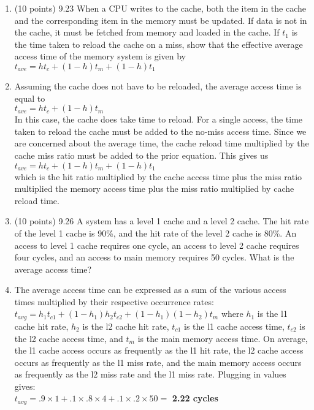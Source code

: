 \documentclass[letterpaper,10pt,onecolumn,titlepage]{article}
\begin{document}
\begin{enumerate}

\item (10 points) 9.23
	When a CPU writes to the cache, both the item in the cache and the corresponding
	item in the memory must be updated. If data is not in the cache, it must be
	fetched from memory and loaded in the cache. If $t_{1}$ is the time taken to
	reload the cache on a miss, show that the effective average access time of the
	memory system is given by \\
	$t_{ave} = ht_{c} + (1-h)t_{m} + (1-h)t_{1}$

\item[\textbullet] Assuming the cache does not have to be reloaded, the average
	access time is equal to \\
	$t_{ave} = ht_{c} + (1-h)t_{m}$ \\
	In this case, the cache does take time to reload. For a single access, the time
	taken to reload the cache must be added to the no-miss access time. Since we are
	concerned about the average time, the cache reload time multiplied by the cache
	miss ratio must be added to the prior equation. This gives us \\
	$t_{ave} = ht_{c} + (1-h)t_{m} + (1-h)t_{1}$ \\
	which is the hit ratio multiplied by the cache access time plus the miss ratio
	multiplied the memory access time plus the miss ratio multiplied by cache reload
	time.

\item (10 points) 9.26
	A system has a level 1 cache and a level 2 cache. The hit rate of the
	level 1 cache is 90\%, and the hit rate of the level 2 cache is 80\%. An access to
	level 1 cache requires one cycle, an access to level 2 cache requires four cycles,
	and an access to main memory requires 50 cycles. What is the average access time?
\item[\textbullet] The average access time can be expressed as a sum of the various access
	times multiplied by their respective occurrence rates: \\
	$t_{avg}=h_{1}t_{c1}+(1-h_{1})h_{2}t_{c2}+(1-h_{1})(1-h_{2})t_{m}$
	where $h_{1}$ is the l1 cache hit rate, $h_{2}$ is the l2 cache hit rate, $t_{c1}$
	is the l1 cache access time, $t_{c2}$ is the l2 cache access time, and $t_{m}$ is
	the main memory access time. On average, the l1 cache access occurs as
	frequently as the l1 hit rate, the l2 cache access occurs as frequently as
	the l1 miss rate, and the main memory access occurs as frequently as the l2 miss
	rate and the l1 miss rate. Plugging in values gives: \\
	$t_{avg}=.9\times1+.1\times.8\times4+.1\times.2\times50=$ \textbf{2.22 cycles}


\end{enumerate}
\end{document}
